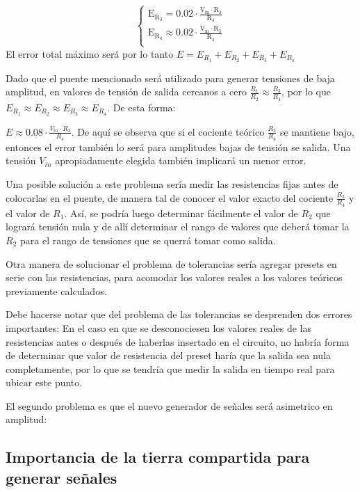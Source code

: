 \documentclass[../../tc_tp3_main.tex]{subfiles}
\begin{document}
 	 	 	\begin{equation}
  	   \left\{
	  	    \begin{array}{ll}
		 					\mathrm{E_{R_3} = 0.02 \cdot \frac{V_{in}\cdot R_3}{R_4}}\\
			 				\mathrm{E_{R_4}  \approx 0.02 \cdot \frac{V_{in} \cdot R_3}{R_4}}  \\
	     	 \end{array}
	     	\right.
 	\end{equation}
 	El error total máximo será por lo tanto $E = E_{R_1} + E_{R_2} + E_{R_3} + E_{R_4}$\par
 	Dado que el puente mencionado será utilizado para generar tensiones de baja amplitud, en valores de tensión de salida cercanos a cero $\frac{R_1}{R_2}\approx\frac{R_3}{R_4}$, por lo que $E_{R_1} \approx E_{R_2} \approx E_{R_3} \approx E_{R_4}$. De esta forma: \par
 	$E \approx 0.08 \cdot \frac{V_{in}\cdot R_3}{R_4}$. De aquí se observa que si el cociente teórico $\frac{R_3}{R_4}$ se mantiene bajo, entonces el error también lo será para amplitudes bajas de tensión se salida. Una tensión $V_{in}$ apropiadamente elegida también implicará un menor error.\par
 	Una posible solución a este problema sería medir las resistencias fijas antes de colocarlas en el puente, de manera tal de conocer el valor exacto del cociente $\frac{R_3}{R_4}$ y el valor de $R_1$. Así, se podría luego determinar fácilmente el valor de $R_2$ que logrará tensión nula y de allí determinar el rango de valores que deberá tomar la $R_2$ para el rango de tensiones que se querrá tomar como salida. \par
 	Otra manera de solucionar el problema de tolerancias sería agregar presets en serie con las resistencias, para acomodar los valores reales a los valores teóricos previamente calculados.\par
 	Debe hacerse notar que del problema de las tolerancias se desprenden dos errores importantes: En el caso en que se desconociesen los valores reales de las resistencias antes o después de haberlas insertado en el circuito, no habría forma de determinar que valor de resistencia del preset haría que la salida sea nula completamente, por lo que se tendría que medir la salida en tiempo real para ubicar este punto. \par
 	El segundo problema es que el nuevo generador de señales será asimetrico en amplitud:
 	
\subsection{Importancia de la tierra compartida para generar señales}
\end{document}
